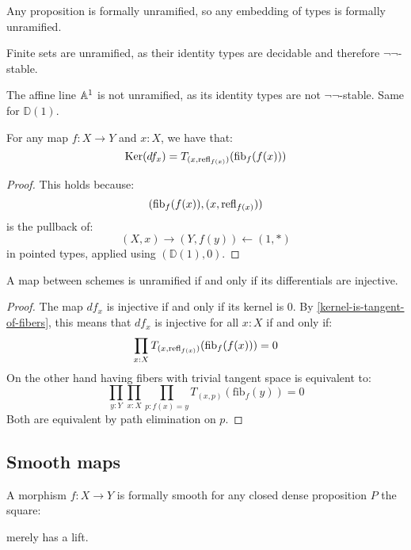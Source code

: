 \begin{example}
Any proposition is formally unramified, so any embedding of types is formally unramified.

Finite sets are unramified, as their identity types are decidable and therefore $\neg\neg$-stable.

The affine line $\mathbb{A}^1$ is not unramified, as its identity types are not $\neg\neg$-stable. Same for $\mathbb{D}(1)$.
\end{example}

\begin{lemma}
\label{kernel-is-tangent-of-fibers}
For any map $f:X\to Y$ and $x:X$, we have that:
\[
\mathrm{Ker}(df_x) = T_{(x,\mathrm{refl}_{f(x)})}(\mathrm{fib}_f(f(x)))
\]
\end{lemma}
\begin{proof}
This holds because:
\[
(\mathrm{fib}_f(f(x)),(x,\mathrm{refl}_{f(x)}))
\]
is the pullback of:
\[
(X,x) \to (Y,f(y)) \leftarrow (1,*)
\]
in pointed types, applied using $(\mathbb{D}(1),0)$.
\end{proof}

\begin{proposition}
A map between schemes is unramified if and only if its differentials are injective. 
\end{proposition}
\begin{proof}
The map $df_x$ is injective if and only if its kernel is $0$. By \cref{kernel-is-tangent-of-fibers}, this means that $df_x$ is injective for all $x:X$ if and only if:
\[
\prod_{x:X}T_{(x,\mathrm{refl}_{f(x)})}(\mathrm{fib}_f(f(x)))=0
\]
On the other hand having fibers with trivial tangent space is equivalent to:
\[
\prod_{y:Y}\prod_{x:X}\prod_{p:f(x)=y} T_{(x,p)}(\mathrm{fib}_f(y)) = 0
\]
Both are equivalent by path elimination on $p$.
\end{proof}

\subsection{Smooth maps}

\begin{definition}
A morphism $f:X\to Y$ is formally smooth for any closed dense proposition $P$ the square:
 \begin{center}
    \end{center}
merely has a lift.
\end{definition}

